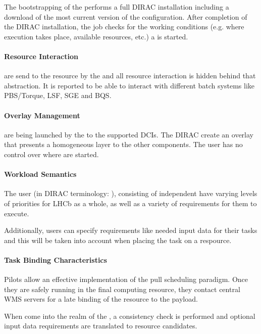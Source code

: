 \documentclass{sig-alternate}
\begin{document}
The bootstrapping of the  performs a full DIRAC
installation including a download of the most current version of the
configuration.
After completion of the DIRAC installation, the job checks for the working
conditions (e.g. where execution takes place, available resources, etc.) a
 is started.

\paragraph{Resource Interaction}

\pilots are send to the resource by the  and all
resource interaction is hidden behind that abstraction.
It is reported to be able to interact with different batch systems like
PBS/Torque, LSF, SGE and BQS.

\paragraph{Overlay Management}

\pilots are being launched by the  to the supported
DCIs.
The DIRAC \pilots create an overlay that presents a homogeneous layer to the
other components.
The user has no control over where \pilots are started.

\paragraph{Workload Semantics}

The user  (in DIRAC terminology: ),
consisting of independent  have varying levels of priorities for
LHCb as a whole, as well as a variety of requirements for them to execute.

Additionally, users can specify requirements like needed input data for their
tasks and this will be taken into account when placing the task on a respource.

\paragraph{Task Binding Characteristics}

Pilots allow an effective implementation of the pull scheduling paradigm. Once
they are safely running in the final computing resource, they contact central
WMS servers for a late binding of the resource to the payload.

When  come into the realm of the , a consistency
check is performed and optional input data requirements are translated to
resource candidates.
\end{document}
